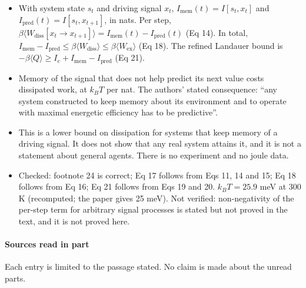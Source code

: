\documentclass[
  10pt,
]{article}
\providecommand{\tightlist}{%
  \setlength{\itemsep}{0pt}\setlength{\parskip}{0pt}}
\begin{document}
\begin{itemize}
\tightlist
\item
  With system state \(s_t\) and driving signal \(x_t\),
  \(I_{\mathrm{mem}}(t) = I[s_t, x_t]\) and
  \(I_{\mathrm{pred}}(t) = I[s_t, x_{t+1}]\), in nats. Per step,
  \(\beta\langle W_{\mathrm{diss}}[x_t \to x_{t+1}]\rangle = I_{\mathrm{mem}}(t) - I_{\mathrm{pred}}(t)\)
  (Eq 14). In total,
  \(I_{\mathrm{mem}} - I_{\mathrm{pred}} \le \beta\langle W_{\mathrm{diss}}\rangle \le \beta\langle W_{\mathrm{ex}}\rangle\)
  (Eq 18). The refined Landauer bound is
  \(-\beta\langle Q\rangle \ge I_e + I_{\mathrm{mem}} - I_{\mathrm{pred}}\)
  (Eq 21).
\item
  Memory of the signal that does not help predict its next value costs
  dissipated work, at \(k_B T\) per nat. The authors' stated
  consequence: ``any system constructed to keep memory about its
  environment and to operate with maximal energetic efficiency has to be
  predictive''.
\item
  This is a lower bound on dissipation for systems that keep memory of a
  driving signal. It does not show that any real system attains it, and
  it is not a statement about general agents. There is no experiment and
  no joule data.
\item
  Checked: footnote 24 is correct; Eq 17 follows from Eqs 11, 14 and 15;
  Eq 18 follows from Eq 16; Eq 21 follows from Eqs 19 and 20.
  \(k_B T = 25.9\) meV at 300 K (recomputed; the paper gives 25 meV).
  Not verified: non-negativity of the per-step term for arbitrary signal
  processes is stated but not proved in the text, and it is not proved
  here.
\end{itemize}

\paragraph{Sources read in part}\label{sources-read-in-part}

Each entry is limited to the passage stated. No claim is made about the
unread parts.
\end{document}
